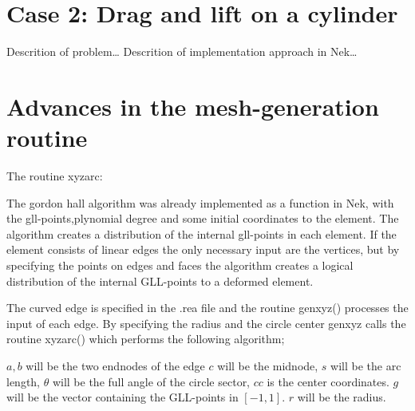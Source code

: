 \section{Case 2: Drag and lift on a cylinder}
Descrition of problem\ldots
Descrition of implementation approach in Nek\ldots

\section{Advances in the mesh-generation routine}
The routine xyzarc:

The gordon hall algorithm was already implemented as a function in Nek, with the gll-points,plynomial degree and some initial 
coordinates to the element. The algorithm creates a distribution of the internal gll-points in each element. 
If the element consists of linear edges the only necessary input are the vertices, but by specifying the points on edges and faces
the algorithm creates a logical distribution of the internal GLL-points to a deformed element. 

The curved edge is specified in the .rea file and the routine genxyz() processes the input of each edge. 
By specifying the radius and the circle center genxyz calls the routine xyzarc() which performs the following algorithm;

    $a,b$ will be the two endnodes of the edge 
    $c$ will be the midnode, $s$ will be the arc length, $\theta$ will be the full angle of the circle sector, $cc$ is the center coordinates.
    $g$ will be the vector containing the GLL-points in $[-1,1]$. $r$ will be the radius.

